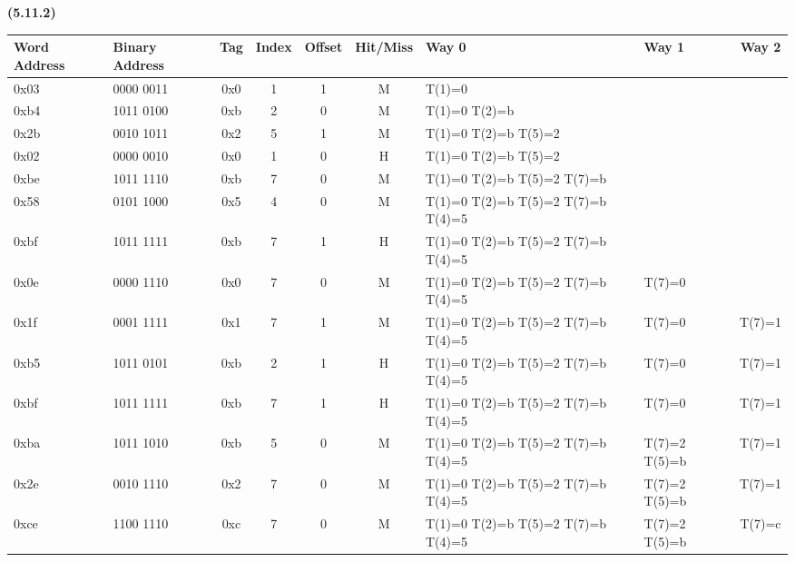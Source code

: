 \documentclass[11pt]{article}
\renewcommand\part[1]{\vspace{.10in}\textbf{(#1)}\par}
\begin{document}
	\part{5.11.2}
		\begin{center}
		\begin{adjustbox}{width=!, height=11cm}
			\begin{tabularx}{\linewidth}{|L|L|c|c|c|c|L|L|c|}
				\hline
				Word Address & Binary Address & Tag & Index & Offset & Hit/Miss & Way 0 & Way 1 & Way 2\\
				\hline
				0x03 & 0000 0011 & 0x0 & 1 & 1 & M & T(1)=0 & &\\
				\hline
				0xb4 & 1011 0100 & 0xb & 2 & 0 & M & T(1)=0 T(2)=b & &\\
				\hline
				0x2b & 0010 1011 & 0x2 & 5 & 1 & M & T(1)=0 T(2)=b T(5)=2 &&\\
				\hline
				0x02 & 0000 0010 & 0x0 & 1 & 0 & H & T(1)=0 T(2)=b T(5)=2 &&\\
				\hline
				0xbe & 1011 1110 & 0xb & 7 & 0 & M & T(1)=0 T(2)=b T(5)=2 T(7)=b &&\\
				\hline
				0x58 & 0101 1000 & 0x5 & 4 & 0 & M & T(1)=0 T(2)=b T(5)=2 T(7)=b T(4)=5 &&\\
				\hline
				0xbf & 1011 1111 & 0xb & 7 & 1 & H & T(1)=0 T(2)=b T(5)=2 T(7)=b T(4)=5  &&\\
				\hline
				0x0e & 0000 1110 & 0x0 & 7 & 0 & M & T(1)=0 T(2)=b T(5)=2 T(7)=b T(4)=5 & T(7)=0 &\\
				\hline
				0x1f & 0001 1111 & 0x1 & 7 & 1 & M & T(1)=0 T(2)=b T(5)=2 T(7)=b T(4)=5  & T(7)=0 & T(7)=1\\
				\hline
				0xb5 & 1011 0101 & 0xb & 2 & 1 & H & T(1)=0 T(2)=b T(5)=2 T(7)=b T(4)=5 & T(7)=0 & T(7)=1\\
				\hline
				0xbf & 1011 1111 & 0xb & 7 & 1 & H & T(1)=0 T(2)=b T(5)=2 T(7)=b T(4)=5 & T(7)=0 & T(7)=1\\
				\hline
				0xba & 1011 1010 & 0xb & 5 & 0 & M & T(1)=0 T(2)=b T(5)=2 T(7)=b T(4)=5 & T(7)=2 T(5)=b & T(7)=1\\
				\hline
				0x2e & 0010 1110 & 0x2 & 7 & 0 & M & T(1)=0 T(2)=b T(5)=2 T(7)=b T(4)=5 & T(7)=2 T(5)=b & T(7)=1\\
				\hline
				0xce & 1100 1110 & 0xc & 7 & 0 & M & T(1)=0 T(2)=b T(5)=2 T(7)=b T(4)=5  & T(7)=2 T(5)=b & T(7)=c\\
				\hline
			\end{tabularx}
		\end{adjustbox}
		\end{center}	
	\newpage
	
\end{document}
